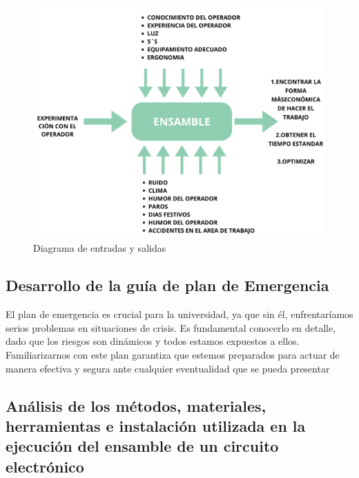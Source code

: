     \begin{figure}[H]
        \centering
        \includegraphics[trim = {1mm 1mm 1mm 1mm},clip,scale=0.2]{34/img/diagramaEntradaSalida.png}
        \caption{Diagrama de entradas y salidas}
        \label{fig:enter-label6}
    \end{figure}
    
    
    
    \subsection{Desarrollo de la guía de plan de Emergencia}
    El plan de emergencia es crucial para la universidad, ya que sin él, enfrentaríamos serios problemas en situaciones de crisis. Es fundamental conocerlo en detalle, dado que los riesgos son dinámicos y todos estamos expuestos a ellos. Familiarizarnos con este plan garantiza que estemos preparados para actuar de manera efectiva y segura ante cualquier eventualidad que se pueda presentar
    \subsection{Análisis de los métodos, materiales, herramientas e instalación utilizada en la ejecución del ensamble de un circuito electrónico}
    
